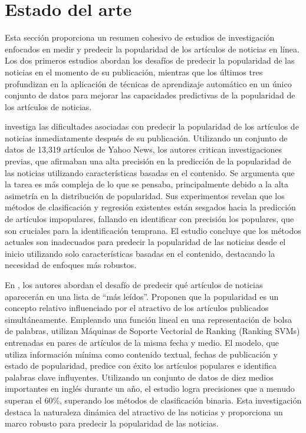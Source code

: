 \documentclass[
  number,
  preprint,
  3p,
  twocolumn]{elsarticle}
\begin{document}
\section{Estado del arte}\label{estado-del-arte}

Esta sección proporciona un resumen cohesivo de estudios de
investigación enfocados en medir y predecir la popularidad de los
artículos de noticias en línea. Los dos primeros estudios abordan los
desafíos de predecir la popularidad de las noticias en el momento de su
publicación, mientras que los últimos tres profundizan en la aplicación
de técnicas de aprendizaje automático en un único conjunto de datos para
mejorar las capacidades predictivas de la popularidad de los artículos
de noticias.

\citep{arapakis2014} investiga las dificultades asociadas con predecir
la popularidad de los artículos de noticias inmediatamente después de su
publicación. Utilizando un conjunto de datos de 13,319 artículos de
Yahoo News, los autores critican investigaciones previas, que afirmaban
una alta precisión en la predicción de la popularidad de las noticias
utilizando características basadas en el contenido. Se argumenta que la
tarea es más compleja de lo que se pensaba, principalmente debido a la
alta asimetría en la distribución de popularidad. Sus experimentos
revelan que los métodos de clasificación y regresión existentes están
sesgados hacia la predicción de artículos impopulares, fallando en
identificar con precisión los populares, que son cruciales para la
identificación temprana. El estudio concluye que los métodos actuales
son inadecuados para predecir la popularidad de las noticias desde el
inicio utilizando solo características basadas en el contenido,
destacando la necesidad de enfoques más robustos.

En \citep{hensinger2012}, los autores abordan el desafío de predecir qué
artículos de noticias aparecerán en una lista de ``más leídos''.
Proponen que la popularidad es un concepto relativo influenciado por el
atractivo de los artículos publicados simultáneamente. Empleando una
función lineal en una representación de bolsa de palabras, utilizan
Máquinas de Soporte Vectorial de Ranking (Ranking SVMs) entrenadas en
pares de artículos de la misma fecha y medio. El modelo, que utiliza
información mínima como contenido textual, fechas de publicación y
estado de popularidad, predice con éxito los artículos populares e
identifica palabras clave influyentes. Utilizando un conjunto de datos
de diez medios importantes en inglés durante un año, el estudio logra
precisiones que a menudo superan el 60\%, superando los métodos de
clasificación binaria. Esta investigación destaca la naturaleza dinámica
del atractivo de las noticias y proporciona un marco robusto para
predecir la popularidad de las noticias.
\end{document}

